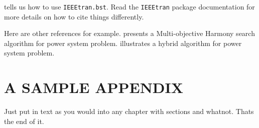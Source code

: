 \documentclass[BTech]{iitpdiss}
\begin{document}
\cite{michael} tells us how to use \verb+IEEEtran.bst+. Read the \verb+IEEEtran+ package documentation for more
details on how to cite things differently. 

Here are other references for example.  \cite{Sivasubramani2011a} presents a
Multi-objective Harmony search algorithm for power system problem. 
\cite{Sivasubramani2011c} illustrates a hybrid algorithm for power system problem. 



\appendix

\chapter{A SAMPLE APPENDIX}

Just put in text as you would into any chapter with sections and
whatnot.  Thats the end of it.


\begin{singlespace}

  
\end{singlespace}




%
\end{document}
